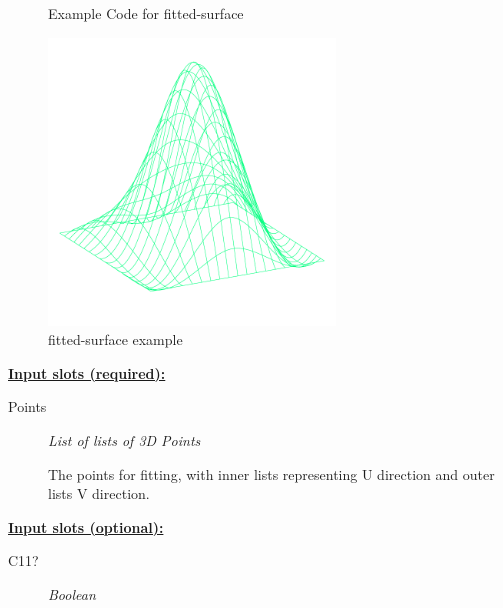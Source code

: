 \documentclass [11pt]{book}
\begin{document}
\begin{itemize}
\begin{figure}
\caption{Example Code for fitted-surface}

\label{fig:example-code-fitted-surface}

\end{figure}

\begin{figure}
\begin{center}
\includegraphics[width=3in,height=3in]{../images/example-fitted-surface.pdf}
\end{center}

\caption{fitted-surface example}

\label{fig:fitted-surface}

\end{figure}





\textbf{
\underline{Input slots (required):}}

\begin{description}

\item [Points]
\emph{List of lists of 3D Points}

 The points for fitting, with inner lists representing U direction and outer lists V direction.




\end{description}






\textbf{
\underline{Input slots (optional):}}

\begin{description}

\item [C11?]
\emph{Boolean}


\end{description}
\end{itemize}
\end{document}
